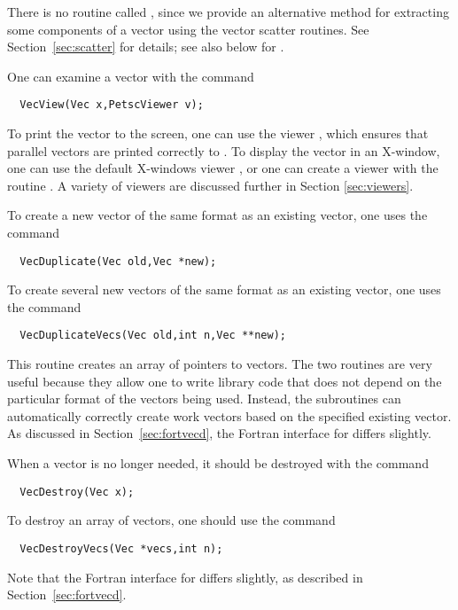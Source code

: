 There is no routine called , since we provide 
an alternative method for extracting some components of a vector using
the vector scatter routines.  See Section~\ref{sec:scatter} for details; see also
below for .

One can examine a vector with the command 
\begin{verbatim}
  VecView(Vec x,PetscViewer v);
\end{verbatim}
To print the vector to the screen, one can use the viewer
 , which ensures
that parallel vectors are printed correctly to . To display the vector in an X-window,
one can use the default X-windows viewer ,
or one can create a viewer with the routine .
A variety of viewers are discussed further in Section \ref{sec:viewers}.

To create a new vector of the same format as an existing vector, one uses
the command 
\begin{verbatim}
  VecDuplicate(Vec old,Vec *new);
\end{verbatim}
To create several new vectors of the same format as an existing vector,
one uses the command 
\begin{verbatim}
  VecDuplicateVecs(Vec old,int n,Vec **new);
\end{verbatim}
This routine creates an array of pointers to vectors. The two routines 
are very useful because they allow one to write library code that does 
not depend on the particular format of the vectors being used. Instead,
the subroutines can automatically correctly create work vectors
based on the specified existing vector.  As discussed in 
Section~\ref{sec:fortvecd}, the Fortran interface for 
differs slightly.

When a vector is no longer needed, it should be destroyed with the 
command 
\begin{verbatim}
  VecDestroy(Vec x);
\end{verbatim}
To destroy an array of vectors, one should use the command 
\begin{verbatim}
  VecDestroyVecs(Vec *vecs,int n);
\end{verbatim}
Note that the Fortran interface for  differs slightly,
as described in Section~\ref{sec:fortvecd}.


